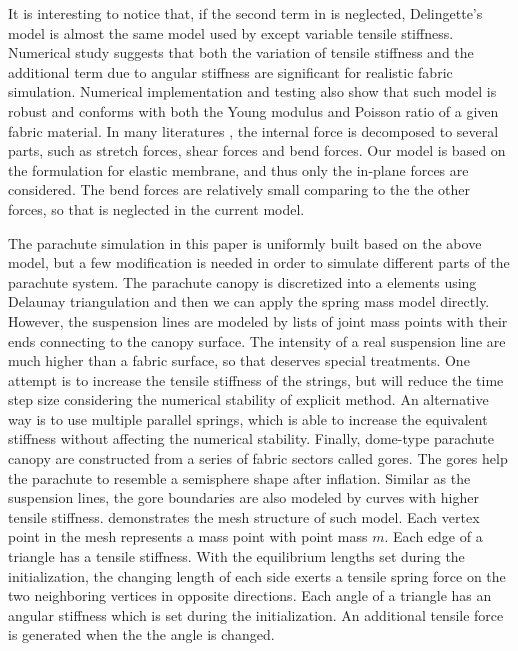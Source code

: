 It is interesting to notice that, if the second term in  is neglected, Delingette's model is almost the same model used by \cite{Kim2013Simulation} except variable tensile stiffness. Numerical study suggests that both the variation of tensile stiffness and the additional term due to angular stiffness are significant for realistic fabric simulation. Numerical implementation and testing also show that such model is robust and conforms with both the Young modulus and Poisson ratio of a given fabric material. In many literatures \cite{Baraff1998Large, Choi2005Stable}, the internal force is decomposed to several parts, such as stretch forces, shear forces and bend forces. Our model is based on the formulation for elastic membrane, and thus only the in-plane forces are considered. The bend forces are relatively small comparing to the the other forces, so that is neglected in the current model.

The parachute simulation in this paper is uniformly built based on the above model, but a few modification is needed in order to simulate different parts of the parachute system. The parachute canopy is discretized into a elements using Delaunay triangulation and then we can apply the spring mass model directly. However, the suspension lines are modeled by lists of joint mass points with their ends connecting to the canopy surface. The intensity of a real suspension line are much higher than a fabric surface, so that deserves special treatments. One attempt is to increase the tensile stiffness of the strings, but will reduce the time step size considering the numerical stability of explicit method. An alternative way is to use multiple parallel springs, which is able to increase the equivalent stiffness without affecting the numerical stability. Finally, dome-type parachute canopy are constructed from a series of fabric sectors called gores. The gores help the parachute to resemble a semisphere shape after inflation. Similar as the suspension lines, the gore boundaries are also modeled by curves with higher tensile stiffness.  demonstrates the mesh structure of such model. Each vertex point in the mesh represents a
mass point with point mass $m$. Each edge of a triangle has a tensile stiffness.
With the equilibrium lengths set during the initialization, the changing length
of each side exerts a tensile spring force on the two neighboring vertices in
opposite directions.  Each angle of a triangle has an angular stiffness which is
set during the initialization. An additional tensile force is generated when the
the angle is changed.

